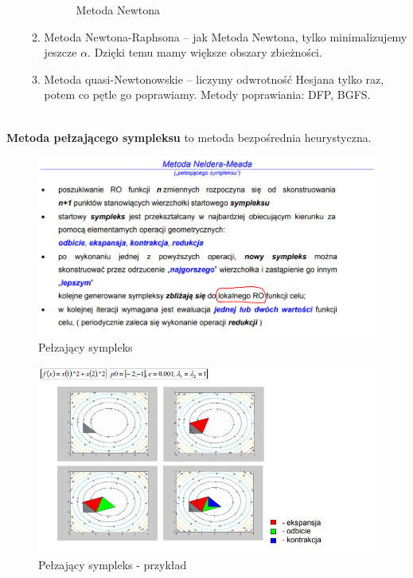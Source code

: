 \documentclass[12pt]{article}
\begin{document}
\begin{enumerate}
\begin{enumerate}
\begin{figure}[H]
			\caption{Metoda Newtona}
		\end{figure}
		\item Metoda Newtona-Raphsona -- jak Metoda Newtona, tylko minimalizujemy jeszcze $\alpha$. Dzięki temu mamy większe obszary zbieżności.
		\item Metoda quasi-Newtonowskie -- liczymy odwrotność Hesjana tylko raz, potem co pętle go poprawiamy. Metody poprawiania: DFP, BGFS. 
	\end{enumerate}
\end{enumerate}
~\\
\textbf{Metoda pełzającego sympleksu} to metoda bezpośrednia heurystyczna.
\begin{figure}[H]
	\centering
	\includegraphics[scale=0.7]{Pictures/pelzajacy_sympleks}
	\caption{Pełzający sympleks}
\end{figure}
\begin{figure}[H]
	\centering
	\includegraphics[scale=0.7]{Pictures/pelzajacy_sympleks2}
	\caption{Pełzający sympleks - przykład}
\end{figure}
\end{document}
